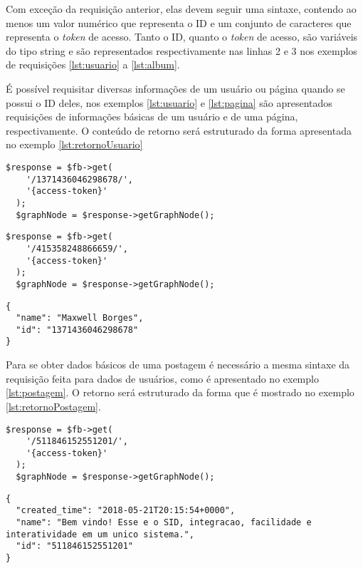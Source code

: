 Com exceção da requisição anterior, elas devem seguir uma sintaxe, contendo ao menos um valor numérico que representa o ID e um conjunto de caracteres que representa o \textit{token} de acesso. Tanto o ID, quanto o \textit{token} de acesso, são variáveis do tipo string e são representados respectivamente nas linhas 2 e 3 nos exemplos de requisições \ref{lst:usuario} a \ref{lst:album}.

É possível requisitar diversas informações de um usuário ou página quando se possui o ID deles, nos exemplos \ref{lst:usuario} e \ref{lst:pagina} são apresentados requisições de informações básicas de um usuário e de uma página, respectivamente. O conteúdo de retorno será estruturado da forma apresentada no exemplo \ref{lst:retornoUsuario}  

\begin{lstlisting}[caption={Requisitar informações de um usuário específico},label={lst:usuario}]
  $response = $fb->get(
    '/1371436046298678/',
    '{access-token}'
  );
  $graphNode = $response->getGraphNode();
\end{lstlisting}

\begin{lstlisting}[caption={Requisitar informações de uma página},label={lst:pagina}]
  $response = $fb->get(
    '/415358248866659/',
    '{access-token}'
  );
  $graphNode = $response->getGraphNode();
\end{lstlisting}

\begin{lstlisting}[caption={Resposta do servidor as requisições \ref{lst:me}, \ref{lst:usuario} e \ref{lst:pagina} (Usuário e Página)},label={lst:retornoUsuario}]
{
  "name": "Maxwell Borges",
  "id": "1371436046298678"
}
\end{lstlisting}

Para se obter dados básicos de uma postagem é necessário a mesma sintaxe da requisição feita para dados de usuários, como é apresentado no exemplo \ref{lst:postagem}. O retorno será estruturado da forma que é mostrado no exemplo \ref{lst:retornoPostagem}.

\begin{lstlisting}[caption={Requisitar informações de uma postagem específica},label={lst:postagem}]
  $response = $fb->get(
    '/511846152551201/',
    '{access-token}'
  );
  $graphNode = $response->getGraphNode();
\end{lstlisting}

\begin{lstlisting}[caption={Resposta do servidor a uma requisição \ref{lst:postagem} (Postagem)},label={lst:retornoPostagem}]
{
  "created_time": "2018-05-21T20:15:54+0000",
  "name": "Bem vindo! Esse e o SID, integracao, facilidade e interatividade em um unico sistema.",
  "id": "511846152551201"
}
\end{lstlisting}

